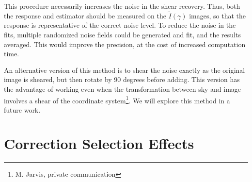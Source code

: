 \documentclass[usegraphicx,usenatbib]{mn2e}
\begin{document}
This procedure necessarily increases the noise in the shear recovery.  Thus,
both the response and estimator should be measured on the $\tilde{I}(\gamma)$
images, so that the response is representative of the correct noise level.  To
reduce the noise in the fits, multiple randomized noise fields could be
generated and fit, and the results averaged.  This would improve the precision,
at the cost of increased computation time.

An alternative version of this method is to shear the noise exactly as the
original image is sheared, but then rotate by 90 degrees before adding.  This
version has the advantage of working even when the transformation between sky
and image involves a shear of the coordinate system\footnote{M. Jarvis, private
communication}. We will explore this method in a future work.


\section{Correction Selection Effects} \label{sec:selection}
\end{document}
